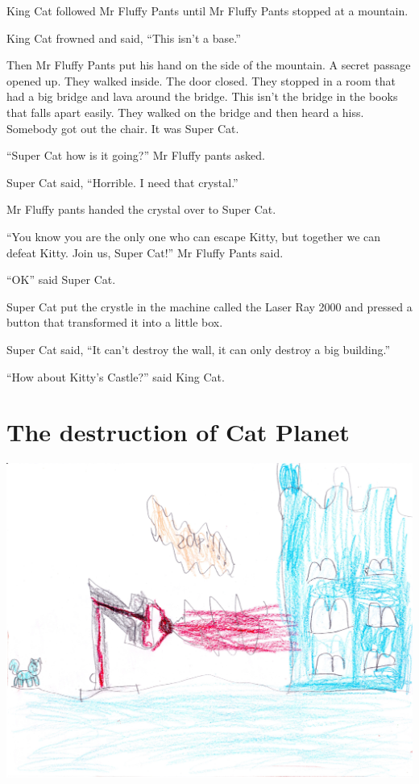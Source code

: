 \documentclass[]{krantz}
\begin{document}
King Cat followed Mr Fluffy Pants until Mr Fluffy Pants stopped at a
mountain.

King Cat frowned and said, ``This isn't a base.''

Then Mr Fluffy Pants put his hand on the side of the mountain. A secret
passage opened up. They walked inside. The door closed. They stopped in
a room that had a big bridge and lava around the bridge. This isn't the
bridge in the books that falls apart easily. They walked on the bridge
and then heard a hiss. Somebody got out the chair. It was Super Cat.

``Super Cat how is it going?'' Mr Fluffy pants asked.

Super Cat said, ``Horrible. I need that crystal.''

Mr Fluffy pants handed the crystal over to Super Cat.

``You know you are the only one who can escape Kitty, but together we
can defeat Kitty. Join us, Super Cat!'' Mr Fluffy Pants said.

``OK'' said Super Cat.

Super Cat put the crystle in the machine called the Laser Ray 2000 and
pressed a button that transformed it into a little box.

Super Cat said, ``It can't destroy the wall, it can only destroy a big
building.''

``How about Kitty's Castle?'' said King Cat.

\hypertarget{the-destruction-of-cat-planet}{%
\chapter{The destruction of Cat
Planet}\label{the-destruction-of-cat-planet}}

\includegraphics{img/laser.jpg}
\end{document}
